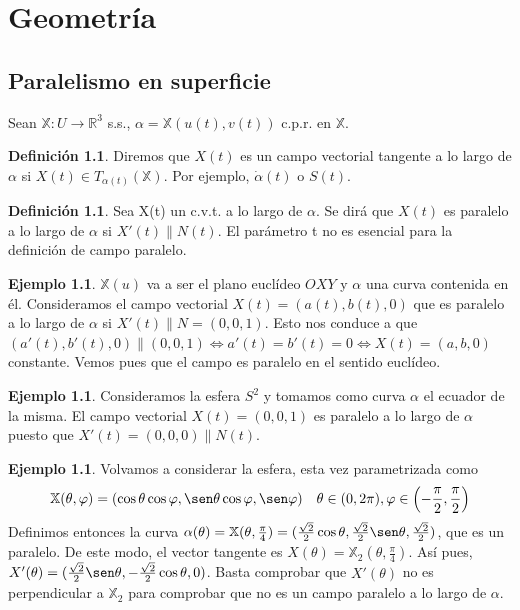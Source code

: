 \documentclass[twoside]{report}
\theoremstyle{definition}
\newtheorem{defi}[theorem]{Definición}
\newtheorem{example}[theorem]{Ejemplo}
\numberwithin{equation}{section}
\newcommand{\R}{\mathbb{R}}
\newcommand{\X}{\mathbb{X}}
\begin{document}
\chapter{Geometría}
\section{Paralelismo en superficie}
Sean $\X:U\to\R^3$ s.s., $\alpha=\X(u(t),v(t))$ c.p.r. en $\X$.

\begin{defi}
Diremos que $X(t)$ es un campo vectorial tangente a lo largo de $\alpha$ si $X(t) \in T_{\alpha(t)}(\X)$. Por ejemplo, $\dot{\alpha}(t)$ o $S(t)$.
\end{defi}

\begin{defi}
Sea X(t) un c.v.t. a lo largo de $\alpha$. Se dirá que $X(t)$ es paralelo a lo largo de $\alpha$ si $X'(t) \parallel N(t)$. El parámetro t no es esencial para la definición de campo paralelo.
\end{defi}

\begin{example}
$\X(u)$ va a ser el plano euclídeo $OXY$ y $\alpha$ una curva contenida en él. Consideramos el campo vectorial $X(t)=(a(t),b(t),0)$ que es paralelo a lo largo de $\alpha$ si $X'(t)\parallel N=(0,0,1)$. Esto nos conduce a que $(a'(t),b'(t),0)\parallel (0,0,1)\Leftrightarrow a'(t)=b'(t)=0\Leftrightarrow X(t)=(a,b,0)$ constante. Vemos pues que el campo es paralelo en el sentido euclídeo.
\end{example}

\begin{example}
Consideramos la esfera $S^2$ y tomamos como curva $\alpha$ el ecuador de la misma. El campo vectorial $X(t)=(0,0,1)$ es paralelo a lo largo de $\alpha$ puesto que $X'(t)=(0,0,0)\parallel N(t)$.
\end{example}

\begin{example}
Volvamos a considerar la esfera, esta vez parametrizada como
\[ \X(\theta,\varphi)=(\cos\theta\cos\varphi,\sen\theta\cos\varphi,\sen\varphi)\quad \theta\in(0,2\pi),\varphi\in\left(-\frac{\pi}{2},\frac{\pi}{2}\right)\]
Definimos entonces la curva $\alpha(\theta)=\X(\theta,\frac{\pi}{4})=(\frac{\sqrt{2}}{2}\cos\theta,\frac{\sqrt{2}}{2}\sen\theta,\frac{\sqrt{2}}{2})$, que es un paralelo. De este modo, el vector tangente es $X(\theta)=\X_2(\theta,\frac{\pi}{4})$. Así pues, $X'(\theta)=(\frac{\sqrt{2}}{2}\sen\theta,-\frac{\sqrt{2}}{2}\cos\theta,0)$. Basta comprobar que $X'(\theta)$ no es perpendicular a $\X_2$ para comprobar que no es un campo paralelo a lo largo de $\alpha$.
\end{example}
\end{document}
